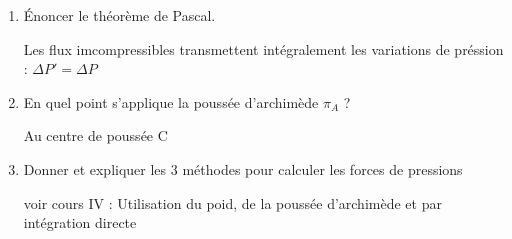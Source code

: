 \documentclass{article}
\begin{document}
\begin{enumerate}[label=\arabic{enumi} - , left=0pt, itemsep=1em]
\begin{solution}
         \end{solution}

         \item Énoncer le théorème de Pascal. \par
         \begin{solution}
            Les flux imcompressibles transmettent intégralement les variations de préssion : $\Delta P' = \Delta P $
            
          \end{solution}

         \item En quel point s'applique la poussée d'archimède $\pi_A$ ? \par
         \begin{solution}
            Au centre de poussée C
          \end{solution}


         \item Donner et expliquer les 3 méthodes pour calculer les forces de pressions \par
         \begin{solution}
            voir cours IV : Utilisation du poid, de la poussée d'archimède et par intégration directe
          \end{solution}
\end{enumerate}
\end{document}
